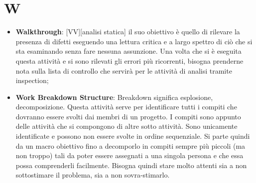 %
%
%
%

\section{W}

\begin{itemize}

	\item \textbf{Walkthrough}: [VV][analisi statica] il suo obiettivo è quello di rilevare la presenza di difetti eseguendo una lettura critica e a largo spettro di ciò che si sta esaminando senza fare nessuna assunzione. Una volta che si è eseguita questa attività e si sono rilevati gli errori più ricorrenti, bisogna prenderne nota sulla lista di controllo che servirà per le attività di analisi tramite inspection;

	\item \textbf{Work Breakdown Structure}: Breakdown significa esplosione, decomposizione. Questa attività serve per identificare tutti i compiti che dovranno essere svolti dai membri di un progetto. I compiti sono appunto delle attività che si compongono di altre sotto attività. Sono unicamente identificate e possono non essere svolte in ordine sequenziale. \newline
Si parte quindi da un macro obiettivo fino a decomporlo in compiti sempre più piccoli (ma non troppo) tali da poter essere assegnati a una singola persona e che essa possa comprenderli facilmente. \newline
Bisogna quindi stare molto attenti sia a non sottostimare il problema, sia a non sovra-stimarlo.

\end{itemize}